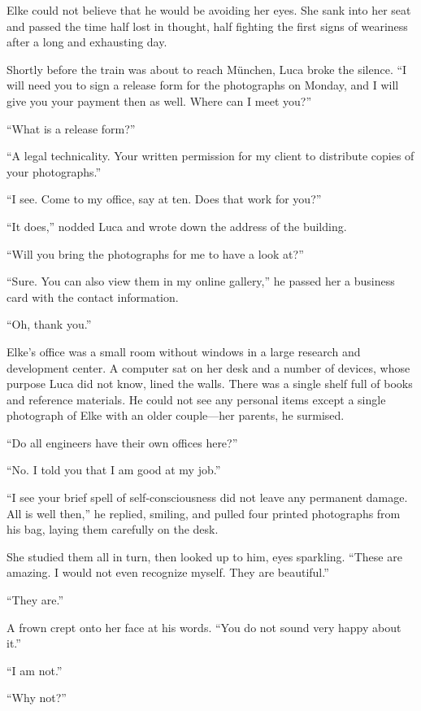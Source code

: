 Elke could not believe that he would be avoiding her eyes. She sank into her seat and passed the time half lost in thought, half fighting the first signs of weariness after a long and exhausting day.

Shortly before the train was about to reach München, Luca broke the silence. ``I will need you to sign a release form for the photographs on Monday, and I will give you your payment then as well. Where can I meet you?''

``What is a release form?''

``A legal technicality. Your written permission for my client to distribute copies of your photographs.''

``I see. Come to my office, say at ten. Does that work for you?''

``It does,'' nodded Luca and wrote down the address of the building.

``Will you bring the photographs for me to have a look at?''

``Sure. You can also view them in my online gallery,'' he passed her a business card with the contact information.

``Oh, thank you.''

\sectionline

Elke's office was a small room without windows in a large research and development center. A computer sat on her desk and a number of devices, whose purpose Luca did not know, lined the walls. There was a single shelf full of books and reference materials. He could not see any personal items except a single photograph of Elke with an older couple---her parents, he surmised.

``Do all engineers have their own offices here?''

``No. I told you that I am good at my job.''

``I see your brief spell of self-consciousness did not leave any permanent damage. All is well then,'' he replied, smiling, and pulled four printed photographs from his bag, laying them carefully on the desk.

She studied them all in turn, then looked up to him, eyes sparkling. ``These are amazing. I would not even recognize myself. They are beautiful.''

``They are.''

A frown crept onto her face at his words. ``You do not sound very happy about it.''

``I am not.''

``Why not?''

